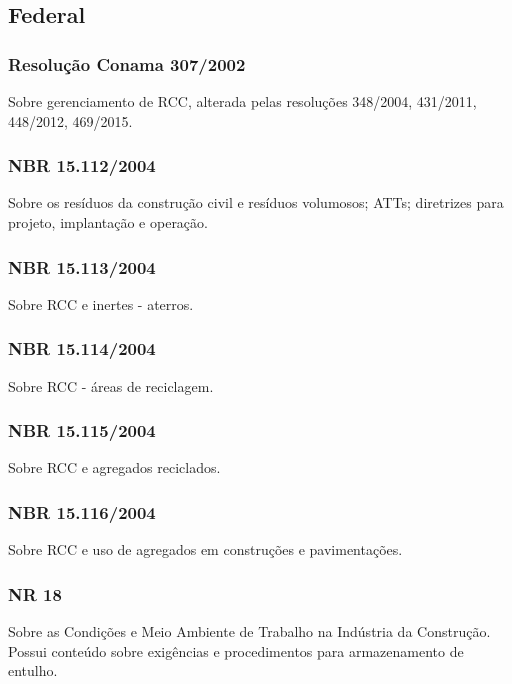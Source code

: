 \subsection{Federal}
\begin{subapend}
	\begin{subsubapend}
		\subsubsection{Resolução Conama 307/2002}
		Sobre gerenciamento de RCC, alterada pelas resoluções 348/2004, 431/2011, 448/2012, 469/2015.
		\subsubsection{NBR 15.112/2004}
		Sobre os resíduos da construção civil e resíduos volumosos; ATTs; diretrizes para projeto, implantação e operação.
		\subsubsection{NBR 15.113/2004}
		Sobre RCC e inertes - aterros.
		\subsubsection{NBR 15.114/2004}
		Sobre RCC - áreas de reciclagem.
		\subsubsection{NBR 15.115/2004}
		Sobre RCC e agregados reciclados.
		\subsubsection{NBR 15.116/2004}
		Sobre RCC e uso de agregados em construções e pavimentações.
		\subsubsection{NR 18}
		Sobre as Condições e Meio Ambiente de Trabalho na Indústria da Construção. Possui conteúdo sobre exigências e procedimentos para armazenamento de entulho.
	\end{subsubapend}
\end{subapend}


